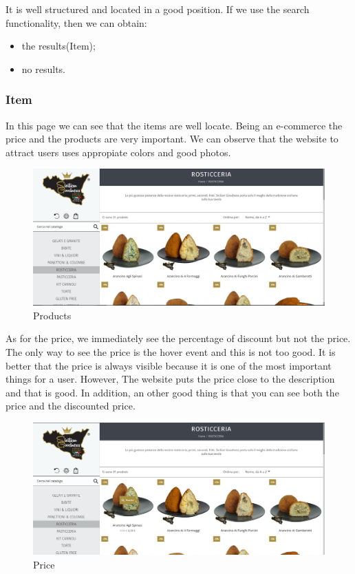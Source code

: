 It is well structured and located in a good position.
If we use the search functionality, then we can obtain:
\begin{itemize}
	\item the results(Item);
	\item no results.
\end{itemize}

\pagebreak
  
\subsubsection{Item}
In this page we can see that the items are well locate.
Being an e-commerce the price and the products are very important.
We can observe that the website to attract users uses appropiate colors and good photos.

\begin{figure}[H]
	\centering\includegraphics[width=12cm]{Img/product.png}
	\caption{Products}
\end{figure}

As for the price, we immediately see the percentage of discount but not the price.
The only way to see the price is the hover event and this is not too good. It is better that the price is always visible because it is one of the most important things for a user.
However, The website puts the price close to the description and that is good. In addition, an other good thing is that you can see both the price and the discounted price.

\begin{figure}[H]
	\centering\includegraphics[width=12cm]{Img/price.png}
	\caption{Price}
\end{figure}


